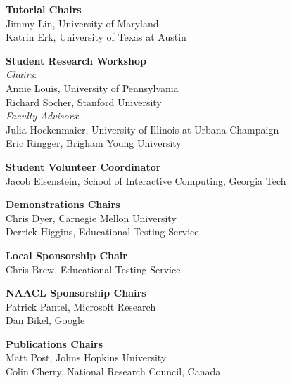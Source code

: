 \vspace{3mm}
{\bf Tutorial Chairs}\vspace{2mm} \\
Jimmy Lin, University of Maryland \\
Katrin Erk, University of Texas at Austin

\vspace{3mm}
{\bf Student Research Workshop}\vspace{2mm} \\
\emph{Chairs}: \\
\hspace*{5mm} Annie Louis, University of Pennsylvania \\
\hspace*{5mm} Richard Socher, Stanford University \\
\emph{Faculty Advisors}: \\
\hspace*{5mm} Julia Hockenmaier, University of Illinois at Urbana-Champaign \\
\hspace*{5mm} Eric Ringger, Brigham Young University

\vspace{3mm}
{\bf Student Volunteer Coordinator}\vspace{2mm} \\
Jacob Eisenstein, School of Interactive Computing, Georgia Tech

\vspace{3mm}
{\bf Demonstrations Chairs}\vspace{2mm} \\
Chris Dyer, Carnegie Mellon University \\
Derrick Higgins, Educational Testing Service

\vspace{3mm}
{\bf Local Sponsorship Chair}\vspace{2mm} \\
Chris Brew, Educational Testing Service

\vspace{3mm}
{\bf NAACL Sponsorship Chairs}\vspace{2mm} \\
Patrick Pantel, Microsoft Research \\
Dan Bikel, Google

\vspace{3mm}
{\bf Publications Chairs}\vspace{2mm} \\
Matt Post, Johns Hopkins University \\
Colin Cherry, National Research Council, Canada

